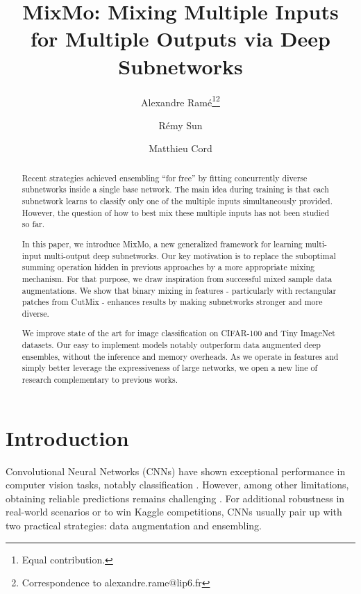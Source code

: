 \documentclass[10pt,twocolumn,letterpaper]{article}
\newcommand*\samethanks[1][\value{footnote}]{\footnotemark[#1]}
\begin{document}
\title{MixMo: Mixing Multiple Inputs for Multiple Outputs via Deep Subnetworks}
\author[1]{Alexandre Ramé\thanks{Equal contribution.}\thanks{Correspondence to alexandre.rame@lip6.fr}}
\author[1,2]{Rémy Sun\samethanks[1]}
\author[1,3]{Matthieu Cord}
\renewcommand\Authands{ and }
\newcommand\blfootnote[1]{\begingroup
  \renewcommand\thefootnote{}\footnote{#1}\addtocounter{footnote}{-1}\endgroup
}
\newcommand{\cmark}{\ding{51}}\newcommand{\xmark}{\ding{55}}\newcommand{\fix}{\marginpar{FIX}}
\newcommand{\new}{\marginpar{NEW}}
\newcommand\mycommfont[1]{\footnotesize\ttfamily\textcolor{blue}{#1}}
\maketitle
\ificcvfinal\thispagestyle{empty}\fi
\begin{abstract}Recent strategies achieved ensembling ``for free'' by fitting concurrently diverse
subnetworks inside a single base network. The main idea during training is that
each subnetwork learns to classify only one of the multiple inputs
simultaneously provided.
However, the question of how to best mix these multiple inputs has not been studied so far.

In this paper, we introduce MixMo, a new generalized framework for learning
multi-input multi-output deep subnetworks. Our key motivation is to replace the
suboptimal summing operation hidden in previous approaches by a more appropriate
mixing mechanism. For that purpose, we draw inspiration from successful mixed
sample data augmentations.
We show that binary mixing in features - particularly with rectangular patches from CutMix - enhances results by making subnetworks stronger and more diverse.

We improve state of the art for image classification on CIFAR-100 and Tiny ImageNet datasets.
Our easy to implement models notably outperform data augmented deep ensembles, without the inference and memory overheads.
As we operate in features and simply better leverage the expressiveness of large networks, we open a new line of research complementary to previous works.%
 \end{abstract}\section{Introduction}

Convolutional Neural Networks (CNNs) have shown exceptional performance in
computer vision tasks, notably classification \cite{krizhevsky2009learning}.
However, among other limitations, obtaining reliable predictions remains
challenging \cite{hendrycks2018benchmarking,ovadia2019can}. For additional
robustness in real-world scenarios or to win Kaggle competitions, CNNs usually
pair up with two practical strategies: data augmentation and ensembling.
\end{document}
